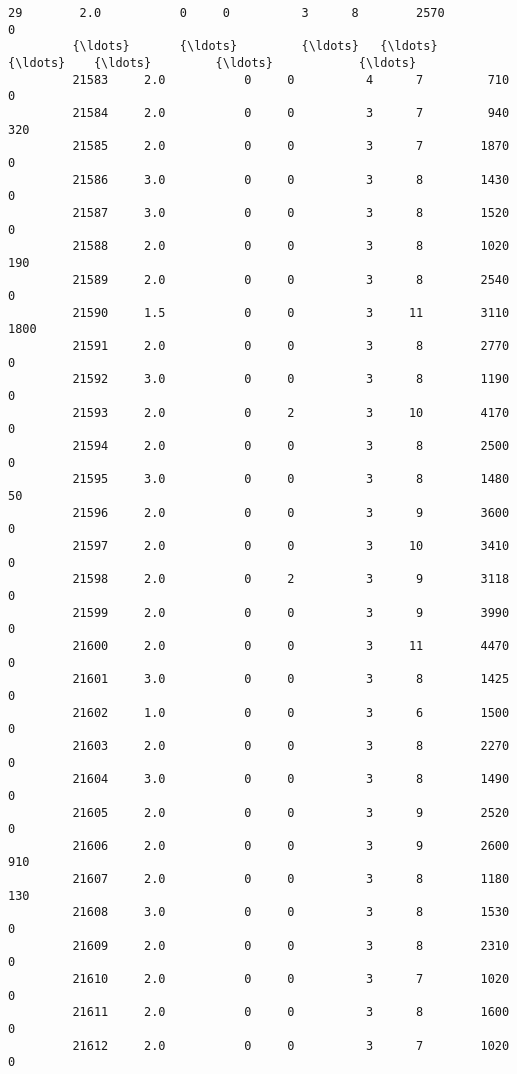 \documentclass[11pt]{article}
\begin{document}
\begin{Verbatim}[commandchars=\\\{\}]
         29        2.0           0     0          3      8        2570              0   
         {\ldots}       {\ldots}         {\ldots}   {\ldots}        {\ldots}    {\ldots}         {\ldots}            {\ldots}   
         21583     2.0           0     0          4      7         710              0   
         21584     2.0           0     0          3      7         940            320   
         21585     2.0           0     0          3      7        1870              0   
         21586     3.0           0     0          3      8        1430              0   
         21587     3.0           0     0          3      8        1520              0   
         21588     2.0           0     0          3      8        1020            190   
         21589     2.0           0     0          3      8        2540              0   
         21590     1.5           0     0          3     11        3110           1800   
         21591     2.0           0     0          3      8        2770              0   
         21592     3.0           0     0          3      8        1190              0   
         21593     2.0           0     2          3     10        4170              0   
         21594     2.0           0     0          3      8        2500              0   
         21595     3.0           0     0          3      8        1480             50   
         21596     2.0           0     0          3      9        3600              0   
         21597     2.0           0     0          3     10        3410              0   
         21598     2.0           0     2          3      9        3118              0   
         21599     2.0           0     0          3      9        3990              0   
         21600     2.0           0     0          3     11        4470              0   
         21601     3.0           0     0          3      8        1425              0   
         21602     1.0           0     0          3      6        1500              0   
         21603     2.0           0     0          3      8        2270              0   
         21604     3.0           0     0          3      8        1490              0   
         21605     2.0           0     0          3      9        2520              0   
         21606     2.0           0     0          3      9        2600            910   
         21607     2.0           0     0          3      8        1180            130   
         21608     3.0           0     0          3      8        1530              0   
         21609     2.0           0     0          3      8        2310              0   
         21610     2.0           0     0          3      7        1020              0   
         21611     2.0           0     0          3      8        1600              0   
         21612     2.0           0     0          3      7        1020              0   
         

\end{Verbatim}
\end{document}

